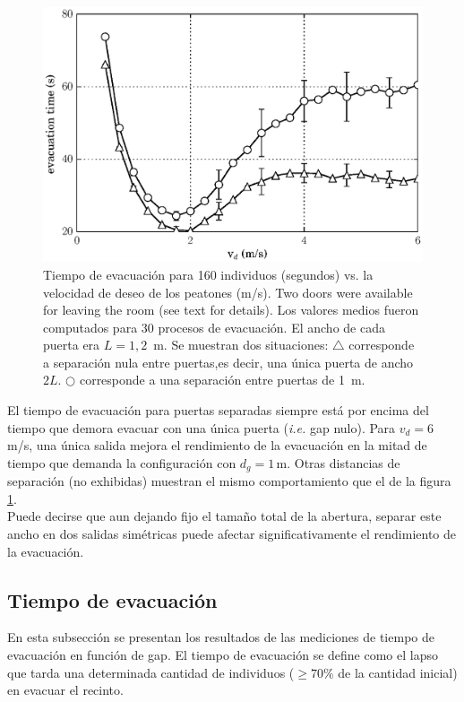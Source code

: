 \begin{figure}[H]
    \centering
    \includegraphics[scale=0.8]{figuras/fis_g.eps}
    \caption[width=5cm]{Tiempo de evacuación para 160 individuos (segundos) vs. la velocidad de deseo de los peatones (m/s). Two doors were available for leaving the room (see text for details). Los valores medios fueron computados para 30 procesos de evacuación. El ancho de cada puerta era $L=1,2$~m. Se muestran dos situaciones:  $\bigtriangleup$ corresponde a separación nula entre puertas,es decir, una única puerta de ancho  $2L$. $\bigcirc$ corresponde a una separación entre puertas de 1~m.}
    \label{fis_g}
\end{figure}

El tiempo de evacuación para puertas separadas siempre está por encima del tiempo que demora evacuar con una única puerta (\emph{i.e.} gap nulo). Para $v_d=6\,$m/s, una única salida mejora el rendimiento de la evacuación en la mitad de tiempo que demanda la configuración con $d_g=1\,$m. Otras distancias de separación (no exhibidas) muestran el mismo comportamiento que el de la figura \ref{fis_g}.\\

Puede decirse que aun dejando fijo el tamaño total de la abertura, separar este ancho en dos salidas simétricas puede afectar significativamente el rendimiento de la evacuación.

\subsection{Tiempo de evacuación}

En esta subsección se presentan los resultados de las mediciones de tiempo de evacuación en función de gap.
El tiempo de evacuación se define como el lapso que tarda una determinada cantidad de individuos ($\ge70\%$ de la cantidad inicial) en evacuar el recinto. \\

